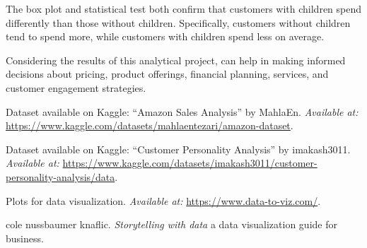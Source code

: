 \documentclass[a4paper]{article}
\begin{document}
\begin{multicols}{2}
The box plot and statistical test both confirm that customers with children spend differently than those without children.
Specifically, customers without children tend to spend more, while customers with children spend less on average.

Considering the results of this analytical project, can help in making informed decisions about pricing, product offerings, financial planning, services, and customer engagement strategies.


\begin{thebibliography}{9}

Dataset available on Kaggle: ``Amazon Sales Analysis'' by MahlaEn. \textit{Available at:} \url{https://www.kaggle.com/datasets/mahlaentezari/amazon-dataset}.

Dataset available on Kaggle: ``Customer Personality Analysis'' by imakash3011. \textit{Available at:} \url{https://www.kaggle.com/datasets/imakash3011/customer-personality-analysis/data}.

Plots for data visualization. \textit{Available at:} \url{https://www.data-to-viz.com/}.


cole nussbaumer knaflic. \textit{Storytelling with data } a data visualization guide for business.

\end{thebibliography}

\end{multicols}
\end{document}
